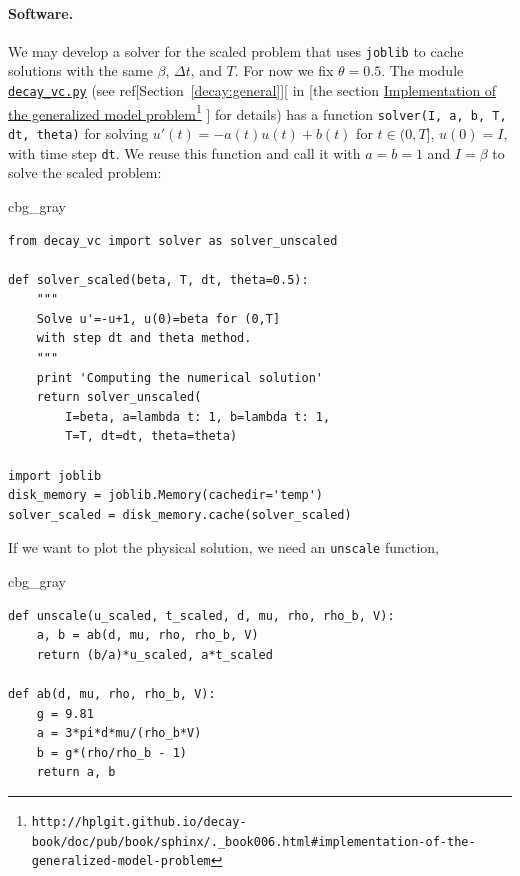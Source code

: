 \documentclass[graybox,envcountchap,sectrefs,final]{svmonodo}
\newenvironment{_cod_tight}[1]{
   \def\FrameCommand{\colorbox{#1}}
   \FrameRule0.6pt\MakeFramed {\FrameRestore}\vskip3mm}
   {\vskip0mm\endMakeFramed}
\newenvironment{cod}[1]{
\bgroup\rmfamily
\fboxsep=0mm\relax
\begin{_cod_tight}{#1}
\list{}{\parsep=-2mm\parskip=0mm\topsep=0pt\leftmargin=2mm
\rightmargin=2\leftmargin\leftmargin=4pt\relax}
\item\relax}
{\endlist\end{_cod_tight}\egroup}
\begin{document}

\paragraph{Software.}
We may develop a solver for the scaled problem that uses \texttt{joblib}
to cache solutions with the same $\beta$, $\Delta t$, and $T$.
For now we fix $\theta=0.5$.
The module \href{{http://tinyurl.com/o8pb3yy/decay_vc.py}}{\nolinkurl{decay_vc.py}}
(see ref[Section~\ref{decay:general}][ in \cite{Langtangen_decay}[the
section \href{{http://hplgit.github.io/decay-book/doc/pub/book/sphinx/._book006.html#implementation-of-the-generalized-model-problem}}{Implementation of the generalized model problem}\footnote{\texttt{http://hplgit.github.io/decay-book/doc/pub/book/sphinx/.\_book006.html\#implementation-of-the-generalized-model-problem}}
\cite{Langtangen_decay}] for details)
has a function
\texttt{solver(I, a, b, T, dt, theta)} for solving $u'(t)=-a(t)u(t)+b(t)$ for
$t\in (0,T]$, $u(0)=I$, with time step \texttt{dt}.
We reuse this function and call it with $a=b=1$ and $I=\beta$ to solve
the scaled problem:

\begin{cod}{cbg_gray}\begin{Verbatim}[numbers=none,fontsize=\fontsize{9pt}{9pt},baselinestretch=0.95,xleftmargin=2mm]
from decay_vc import solver as solver_unscaled

def solver_scaled(beta, T, dt, theta=0.5):
    """
    Solve u'=-u+1, u(0)=beta for (0,T]
    with step dt and theta method.
    """
    print 'Computing the numerical solution'
    return solver_unscaled(
        I=beta, a=lambda t: 1, b=lambda t: 1,
        T=T, dt=dt, theta=theta)

import joblib
disk_memory = joblib.Memory(cachedir='temp')
solver_scaled = disk_memory.cache(solver_scaled)
\end{Verbatim}
\end{cod}
\noindent
If we want to plot the physical solution, we need an \texttt{unscale} function,

\begin{cod}{cbg_gray}\begin{Verbatim}[numbers=none,fontsize=\fontsize{9pt}{9pt},baselinestretch=0.95,xleftmargin=2mm]
def unscale(u_scaled, t_scaled, d, mu, rho, rho_b, V):
    a, b = ab(d, mu, rho, rho_b, V)
    return (b/a)*u_scaled, a*t_scaled

def ab(d, mu, rho, rho_b, V):
    g = 9.81
    a = 3*pi*d*mu/(rho_b*V)
    b = g*(rho/rho_b - 1)
    return a, b
\end{Verbatim}
\end{cod}
\noindent
\end{document}
